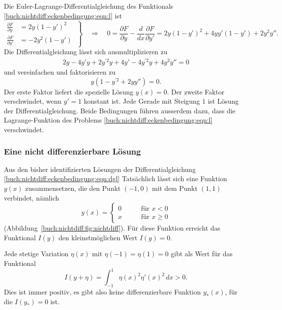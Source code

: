 Die Euler-Lagrange-Differentialgleichung des Funktionals
\eqref{buch:nichtdiff:eckenbedingung:eqn:l} ist
\begin{equation*}
\left.
\begin{aligned}
\frac{\partial F}{\partial y}
&=
2y(1-y')^2
\\
\frac{\partial F}{\partial y'}
&=
-2y^2(1-y')
\end{aligned}
\;
\right\}
\quad\Rightarrow\quad
0
=
\frac{\partial F}{\partial y}-\frac{d}{dx}\frac{\partial F}{\partial y'}
=
2y(1-y')^2
+4yy'(1-y') + 2y^2y''.
\end{equation*}
Die Differentialgleichung lässt sich ausmultiplizieren zu
\begin{align*}
2y
-4y'y
+
2y^{\prime 2}y
+
4y'
-
4y^{\prime 2}y
+
4y^2y''
=
0
\end{align*}
und vereinfachen und faktorisieren zu
\begin{equation}
y(1-y^{\prime 2}+2yy'')
=
0.
\label{buch:nichtdiff:eckenbedingung:eqn:dgl}
\end{equation}
Der erste Faktor liefert die spezielle Lösung $y(x)=0$.
Der zweite Faktor verschwindet, wenn $y'=1$ konstant ist.
Jede Gerade mit Steigung $1$ ist Lösung der Differentialgleichung.
Beide Bedingungen führen ausserdem dazu, dass die Lagrange-Funktion
des Problems
\eqref{buch:nichtdiff:eckenbedingung:eqn:l}
verschwindet.

%
%
\subsubsection{Eine nicht differenzierbare Lösung}

Aus den bisher identifizierten Lösungen der Differentialgleichung
\eqref{buch:nichtdiff:eckenbedingung:eqn:dgl}
Tatsächlich lässt sich eine Funktion $y(x)$ zusammensetzen,
die den Punkt $(-1,0)$ mit dem Punkt $(1,1)$ verbindet,
nämlich
\[
y(x)
=
\begin{cases}
0&\qquad \text{für $x<0$}\\
x&\qquad \text{für $x\ge 0$}
\end{cases}
\]
(Abbildung~\ref{buch:nichtdiff:fig:nichtdiff}).
Für diese Funktion erreicht das Funktional $I(y)$ den kleinstmöglichen
Wert $I(y)=0$.

Jede stetige Variation $\eta(x)$ mit $\eta(-1)=\eta(1)=0$ gibt als Wert
für das Funktional
\[
I(y+\eta)
=
\int_{-1}^1 \eta(x)^2 \eta'(x)^2 \,dx
>0.
\]
Dies ist immer positiv, es gibt also keine differenzierbare
Funktion $y_*(x)$, für die $I(y_*)=0$ ist.

